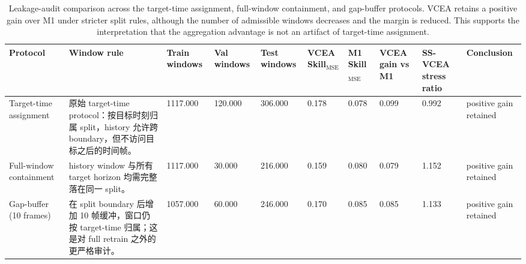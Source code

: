 \begin{table}[t]
\centering
\scriptsize
\begin{tabular}{llllllllll}
\toprule
Protocol & Window rule & Train windows & Val windows & Test windows & VCEA Skill$_{\mathrm{MSE}}$ & M1 Skill$_{\mathrm{MSE}}$ & VCEA gain vs M1 & SS-VCEA stress ratio & Conclusion \\
\midrule
Target-time assignment & 原始 target-time protocol：按目标时刻归属 split，history 允许跨 boundary，但不访问目标之后的时间帧。 & 1117.000 & 120.000 & 306.000 & 0.178 & 0.078 & 0.099 & 0.992 & positive gain retained \\
Full-window containment & history window 与所有 target horizon 均需完整落在同一 split。 & 1117.000 & 30.000 & 216.000 & 0.159 & 0.080 & 0.079 & 1.152 & positive gain retained \\
Gap-buffer (10 frames) & 在 split boundary 后增加 10 帧缓冲，窗口仍按 target-time 归属；这是对 full retrain 之外的更严格审计。 & 1057.000 & 60.000 & 246.000 & 0.170 & 0.085 & 0.085 & 1.133 & positive gain retained \\
\bottomrule
\end{tabular}
\caption{Leakage-audit comparison across the target-time assignment, full-window containment, and gap-buffer protocols. VCEA retains a positive gain over M1 under stricter split rules, although the number of admissible windows decreases and the margin is reduced. This supports the interpretation that the aggregation advantage is not an artifact of target-time assignment.}
\label{tab:e1_leakage_audit}
\end{table}
